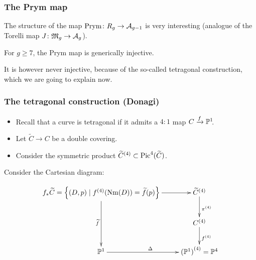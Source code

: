 

\begin{frame}
\frametitle{The Prym map}

The structure of the map $\Prym\colon R_g \to \A_{g-1}$ is very interesting (analogue of the Torelli map $J\colon\mathfrak M_g \to \A_g$).

\pause

\begin{theorem}

For $g \geq 7$, the Prym map is generically injective. 

\end{theorem}
\pause

It is however \alert{never} injective, because of the so-called \alert{tetragonal construction}, which we are going to explain now.
\end{frame}

\begin{frame}
\frametitle{The tetragonal construction (Donagi)}

\begin{itemize}
	\item Recall that a curve is \alert{tetragonal} if it admits a $4:1$ map $C \xrightarrow{f} \P^1\mkern-4mu$.
	\pause
	\item Let $\widetilde C \to C$ be a double covering.
	\pause
	\item Consider the symmetric product ${\widetilde C}^{(4)} \subset \Pic^4(\widetilde C)$.
\end{itemize}
\pause

Consider the Cartesian diagram:

\[
\xymatrix{
f_\ast \widetilde C = \left\{ (D,p) \mid f^{(4)}(\Nm(D)) = \widetilde f (p) \right\} \ar[r] \ar[dd]_{\widetilde f} & {\widetilde C}^{(4)} \ar[d]^{\pi^{(4)}} \\
 & C^{(4)} \ar[d]^{f^{(4)}} \\
\P^1 \ar[r]^\Delta & {(\P^1)}^{(4)} = \P^4
}
\]
\end{frame}

